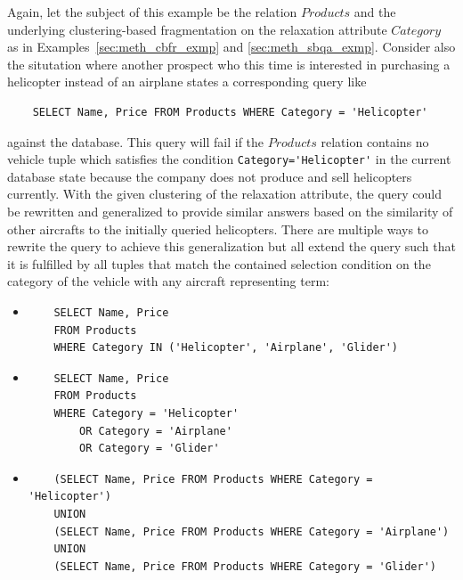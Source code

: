 \begin{exmp}
\label{sec:meth_fqa_exmp}
Again, let the subject of this example be the relation $Products$ and the underlying clustering-based fragmentation on the relaxation attribute $Category$
as in Examples~\ref{sec:meth_cbfr_exmp} and \ref{sec:meth_sbqa_exmp}. Consider also the situtation where another prospect who this time is interested in 
purchasing a helicopter instead of an airplane states a corresponding query like
\begin{verbatim}
    SELECT Name, Price FROM Products WHERE Category = 'Helicopter'
\end{verbatim}
against the database. This query will fail if the $Products$ relation contains no vehicle tuple which satisfies the condition \verb!Category='Helicopter'!
in the current database state because the company does not produce and sell helicopters currently. With the given clustering of the relaxation attribute,
the query could be rewritten and generalized to provide similar answers based on the similarity of other aircrafts to the initially queried helicopters.
There are multiple ways to rewrite the query to achieve this generalization but all extend the query such that it is fulfilled by all tuples that match the
contained selection condition on the category of the vehicle with any aircraft representing term:

\begin{itemize}
    \item \begin{verbatim}
    SELECT Name, Price
    FROM Products 
    WHERE Category IN ('Helicopter', 'Airplane', 'Glider')
    \end{verbatim}
    
    \item \begin{verbatim}
    SELECT Name, Price 
    FROM Products 
    WHERE Category = 'Helicopter' 
        OR Category = 'Airplane' 
        OR Category = 'Glider'
    \end{verbatim}

    \item \begin{verbatim}
    (SELECT Name, Price FROM Products WHERE Category = 'Helicopter')
    UNION 
    (SELECT Name, Price FROM Products WHERE Category = 'Airplane')
    UNION 
    (SELECT Name, Price FROM Products WHERE Category = 'Glider')
    \end{verbatim}
\end{itemize}


\end{exmp}
